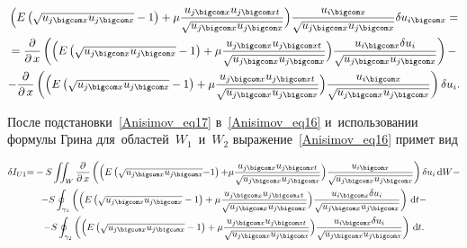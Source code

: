 \begin{multline}\label{Anisimov_eq17}

\Bigl(E\left(\sqrt{u_{j \bigcom x}u_{j \bigcom x}}-1\right)+ \mu\frac{u_{j \bigcom x}u_{j \bigcom xt}}{\sqrt{u_{j \bigcom x}u_{j \bigcom x}}}\Bigr) \frac{u_{i \bigcom x}}{\sqrt{u_{j \bigcom x}u_{j \bigcom x}}}\delta u_{i \bigcom x}=\\

=

\frac{\partial}{\partial\,x}\left(\Bigl(E\left(\sqrt{u_{j \bigcom x}u_{j \bigcom x}}-1\right)+ \mu\frac{u_{j \bigcom x}u_{j \bigcom xt}}{\sqrt{u_{j \bigcom x}u_{j \bigcom x}}}\Bigr) \frac{u_{i \bigcom x}\delta u_i}{\sqrt{u_{j \bigcom x}u_{j \bigcom x}}}\right)-\\

-\frac{\partial}{\partial\,x}\left(\Bigl(E\left(\sqrt{u_{j \bigcom x}u_{j \bigcom x}}-1\right)+ \mu\frac{u_{j \bigcom x}u_{j \bigcom xt}}{\sqrt{u_{j \bigcom x}u_{j \bigcom x}}}\Bigr) \frac{u_{i \bigcom x}}{\sqrt{u_{j \bigcom x}u_{j \bigcom x}}}\right)\delta u_i.

\end{multline}

После подстановки~\eqref{Anisimov_eq17} в~\eqref{Anisimov_eq16} и~использовании формулы Грина  для~областей~$W_1$~и~$W_2$ выражение~\eqref{Anisimov_eq16} примет вид

\begin{multline}\label{Anisimov_eq18}

\delta I_{U1}{=}-

S\iint_{W}\frac{\partial}{\partial\,x} \left(\Bigl(E\left(\sqrt{u_{j \bigcom x}u_{j \bigcom x}}{-}1\right){+} \mu\frac{u_{j \bigcom x}u_{j \bigcom xt}}{\sqrt{u_{j \bigcom x}u_{j \bigcom x}}}\Bigr) \frac{u_{i \bigcom x}}{\sqrt{u_{j \bigcom x}u_{j \bigcom x}}}\right)\delta u_{i}\,\mathrm{d}W-\\

-S\oint_{\gamma_1}\left(\Bigl(E\left(\sqrt{u_{j \bigcom x}u_{j \bigcom x}}-1\right)+ \mu\frac{u_{j \bigcom x}u_{j \bigcom xt}}{\sqrt{u_{j \bigcom x}u_{j \bigcom x}}}\Bigr) \frac{u_{i \bigcom x}\delta u_i}{\sqrt{u_{j \bigcom x}u_{j \bigcom x}}}\right)\,\mathrm{d}t-\\

-S\oint_{\gamma_2}\left(\Bigl(E\left(\sqrt{u_{j \bigcom x}u_{j \bigcom x}}-1\right)+ \mu\frac{u_{j \bigcom x}u_{j \bigcom xt}}{\sqrt{u_{j \bigcom x}u_{j \bigcom x}}}\Bigr) \frac{u_{i \bigcom x}\delta u_i}{\sqrt{u_{j \bigcom x}u_{j \bigcom x}}}\right)\,\mathrm{d}t.

\end{multline}



